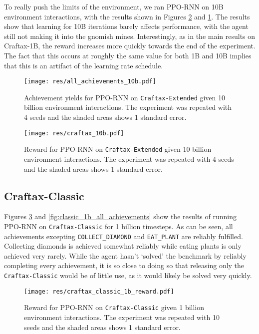 \documentclass{article}
\theoremstyle{plain}
\theoremstyle{definition}
\theoremstyle{remark}
\begin{document}
To really push the limits of the environment, we ran PPO-RNN on 10B environment interactions, with the results shown in Figures \ref{fig:craftax_10b} and \ref{fig:craftax_10b_achievements}.  The results show that learning for 10B iterations barely affects performance, with the agent still not making it into the gnomish mines.  Interestingly, as in the main results on Craftax-1B, the reward increases more quickly towards the end of the experiment.  The fact that this occurs at roughly the same value for both 1B and 10B implies that this is an artifact of the learning rate schedule.


\begin{figure}[H]
    \centering
    \texttt{[image: res/all\_achievements\_10b.pdf]}
    \caption{Achievement yields for PPO-RNN on \texttt{Craftax-Extended} given 10 billion environment interactions.  The experiment was repeated with 4 seeds and the shaded areas shows 1 standard error.}
    \label{fig:craftax_10b_achievements}
\end{figure}

\begin{figure}[H]
    \centering
    \texttt{[image: res/craftax\_10b.pdf]}
    \caption{Reward for PPO-RNN on \texttt{Craftax-Extended} given 10 billion environment interactions.  The experiment was repeated with 4 seeds and the shaded areas shows 1 standard error.}
    \label{fig:craftax_10b}
\end{figure}


\subsection{Craftax-Classic} \label{app:classic_experiments}

Figures \ref{fig:classic_1b_reward} and \ref{fig:classic_1b_all_achievements} show the results of running PPO-RNN on \texttt{Craftax-Classic} for 1 billion timesteps.  As can be seen, all achievements excepting \texttt{COLLECT\_DIAMOND} and \texttt{EAT\_PLANT} are reliably fulfilled.  Collecting diamonds is achieved somewhat reliably while eating plants is only achieved very rarely.  While the agent hasn't `solved' the benchmark by reliably completing every achievement, it is so close to doing so that releasing only the \texttt{Craftax-Classic} would be of little use, as it would likely be solved very quickly. 

\begin{figure}[H]
    \centering
    \texttt{[image: res/craftax\_classic\_1b\_reward.pdf]}
    \caption{Reward for PPO-RNN on \texttt{Craftax-Classic} given 1 billion environment interactions.  The experiment was repeated with 10 seeds and the shaded areas shows 1 standard error.}
    \label{fig:classic_1b_reward}
\end{figure}
\end{document}
